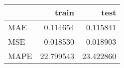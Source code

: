 \begin{tabular}{lrr}
\toprule
{} &      train &       test \\
\midrule
MAE  &   0.114654 &   0.115841 \\
MSE  &   0.018530 &   0.018903 \\
MAPE &  22.799543 &  23.422860 \\
\bottomrule
\end{tabular}
